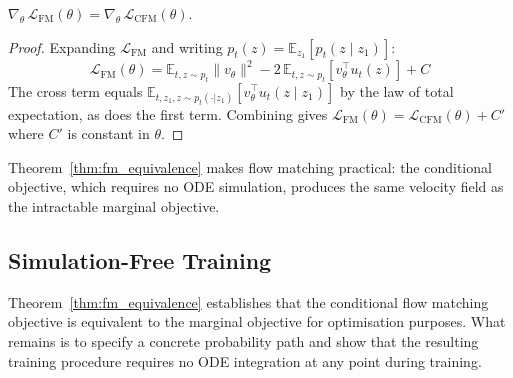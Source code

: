     \begin{theorem}
    \label{thm:fm_equivalence}
    $\nabla_\theta\, \mathcal{L}_\text{FM}(\theta) = \nabla_\theta\, \mathcal{L}_\text{CFM}(\theta)$.
    \end{theorem}

    \begin{proof}
    Expanding $\mathcal{L}_\text{FM}$ and writing $p_t(z) = \mathbb{E}_{z_1}[p_t(z \mid z_1)]$:
    \begin{equation}
        \mathcal{L}_\text{FM}(\theta) = \mathbb{E}_{t, z \sim p_t} \|v_\theta\|^2 - 2\,\mathbb{E}_{t, z \sim p_t}\left[v_\theta^\top u_t(z)\right] + C
    \end{equation}
    The cross term equals $\mathbb{E}_{t, z_1, z \sim p_t(\cdot|z_1)}[v_\theta^\top u_t(z \mid z_1)]$ by the law of total expectation, as does the first term. Combining gives $\mathcal{L}_\text{FM}(\theta) = \mathcal{L}_\text{CFM}(\theta) + C'$ where $C'$ is constant in $\theta$.
    \end{proof}

    Theorem~\ref{thm:fm_equivalence} makes flow matching practical: the conditional objective, which requires no ODE simulation, produces the same velocity field as the intractable marginal objective.

    \subsection{Simulation-Free Training}

    Theorem~\ref{thm:fm_equivalence} establishes that the conditional flow matching objective is equivalent to the marginal objective for optimisation purposes. What remains is to specify a concrete probability path and show that the resulting training procedure requires no ODE integration at any point during training.

